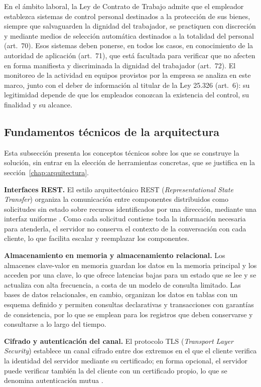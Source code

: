 En el ámbito laboral, la Ley de Contrato de Trabajo \parencite{Ley20744} admite que el empleador
establezca sistemas de control personal destinados a la protección de sus bienes, siempre que
salvaguarden la dignidad del trabajador, se practiquen con discreción y mediante medios de
selección automática destinados a la totalidad del personal (art.~70). Esos sistemas deben
ponerse, en todos los casos, en conocimiento de la autoridad de aplicación (art.~71), que está
facultada para verificar que no afecten en forma manifiesta y discriminada la dignidad del
trabajador (art.~72).
El monitoreo de la actividad en equipos provistos por la empresa se analiza en este marco, junto
con el deber de información al titular de la Ley 25.326 (art.~6): su legitimidad depende de que
los empleados conozcan la existencia del control, su finalidad y su alcance.

\subsection{Fundamentos técnicos de la arquitectura}\label{sec:fundamentos-tecnicos}
Esta subsección presenta los conceptos técnicos sobre los que se construye la solución, sin entrar en la elección de herramientas concretas, que se justifica en la sección~\ref{chap:arquitectura}.

\textbf{Interfaces REST.} El estilo arquitectónico REST (\emph{Representational State Transfer}) organiza la comunicación entre componentes distribuidos como solicitudes sin estado sobre recursos identificados por una dirección, mediante una interfaz uniforme \parencite{Fielding2000}. Como cada solicitud contiene toda la información necesaria para atenderla, el servidor no conserva el contexto de la conversación con cada cliente, lo que facilita escalar y reemplazar los componentes.

\textbf{Almacenamiento en memoria y almacenamiento relacional.} Los almacenes clave-valor en memoria guardan los datos en la memoria principal y los acceden por una clave, lo que ofrece latencias bajas para un estado que se lee y se actualiza con alta frecuencia, a costa de un modelo de consulta limitado. Las bases de datos relacionales, en cambio, organizan los datos en tablas con un esquema definido y permiten consultas declarativas y transacciones con garantías de consistencia, por lo que se emplean para los registros que deben conservarse y consultarse a lo largo del tiempo.

\textbf{Cifrado y autenticación del canal.} El protocolo TLS (\emph{Transport Layer Security}) establece un canal cifrado entre dos extremos en el que el cliente verifica la identidad del servidor mediante su certificado; en forma opcional, el servidor puede verificar también la del cliente con un certificado propio, lo que se denomina autenticación mutua \parencite{Rescorla2018}.

